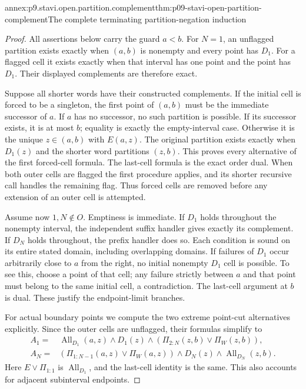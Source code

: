 \begin{annexitem}{annex:p9.stavi.open.partition.complement}{thm:p09-stavi-open-partition-complement}{The complete terminating partition-negation induction}
\begin{proof}
All assertions below carry the
guard \(a<b\). For \(N=1\),
an unflagged partition exists
exactly when \((a,b)\) is
nonempty and every point has
\(D_1\). For a flagged cell
it exists exactly when that
interval has one point and
the point has \(D_1\).
Their displayed complements
are therefore exact.

Suppose all shorter words have
their constructed complements.
If the initial cell is forced
to be a singleton, the first
point of \((a,b)\) must be the
immediate successor of \(a\).
If \(a\) has no successor,
no such partition is possible.
If its successor exists, it
is at most \(b\); equality
is exactly the empty-interval
case. Otherwise it is the
unique \(z\in(a,b)\) with
\(E(a,z)\). The original
partition exists exactly when
\(D_1(z)\) and the shorter
word partitions \((z,b)\).
This proves every alternative
of the first forced-cell
formula. The last-cell formula
is the exact order dual.
When both outer cells are
flagged the first procedure
applies, and its shorter
recursive call handles the
remaining flag. Thus forced
cells are removed before
any extension of an outer
cell is attempted.

Assume now \(1,N\notin O\).
Emptiness is immediate.
If \(D_1\) holds throughout
the nonempty interval, the
independent suffix handler
gives exactly its complement.
If \(D_N\) holds throughout,
the prefix handler does so.
Each condition is sound on
its entire stated domain,
including overlapping domains.
If failures of \(D_1\) occur
arbitrarily close to \(a\)
from the right, no initial
nonempty \(D_1\) cell is
possible. To see this, choose
a point of that cell; any
failure strictly between
\(a\) and that point must
belong to the same initial
cell, a contradiction.
The last-cell argument at
\(b\) is dual. These justify
the endpoint-limit branches.

For actual boundary points
we compute the two extreme
point-cut alternatives explicitly.
Since the outer cells are
unflagged, their formulas
simplify to
\[
\begin{split}
 A_1={}&\operatorname{All}_{D_1}(a,z)\land D_1(z)
              \land(\Pi_{2:N}(z,b)\lor\Pi_W(z,b)),\\
 A_N={}&(\Pi_{1:N-1}(a,z)\lor\Pi_W(a,z))
              \land D_N(z)\land\operatorname{All}_{D_N}(z,b).
\end{split}
\]
Here \(E\lor\Pi_{1:1}\) is
\(\operatorname{All}_{D_1}\),
and the last-cell identity
is the same. This also
accounts for adjacent
subinterval endpoints.


\end{proof}
\end{annexitem}
